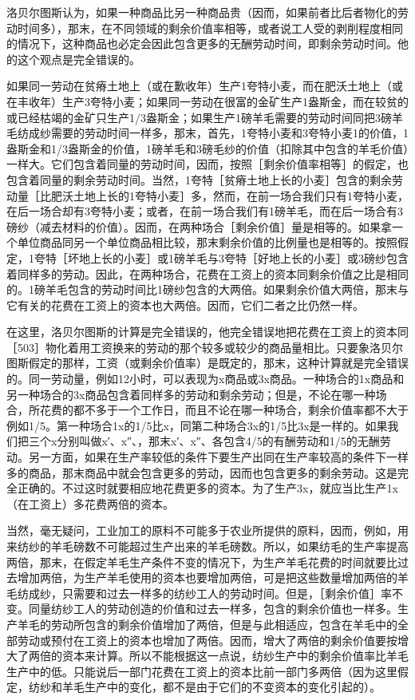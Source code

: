 洛贝尔图斯认为，如果一种商品比另一种商品贵（因而，如果前者比后者物化的劳动时间多），那末，在不同领域的剩余价值率相等，或者说工人受的剥削程度相同的情况下，这种商品也必定会因此包含更多的无酬劳动时间，即剩余劳动时间。他的这个观点是完全错误的。

如果同一劳动在贫瘠土地上（或在歉收年）生产1夸特小麦，而在肥沃土地上（或在丰收年）生产3夸特小麦；如果同一劳动在很富的金矿生产1盎斯金，而在较贫的或已经枯竭的金矿只生产1/3盎斯金；如果生产1磅羊毛需要的劳动时间同把3磅羊毛纺成纱需要的劳动时间一样多，那末，首先，1夸特小麦和3夸特小麦1的价值，1盎斯金和1/3盎斯金的价值，1磅羊毛和3磅毛纱的价值（扣除其中包含的羊毛价值）一样大。它们包含着同量的劳动时间，因而，按照［剩余价值率相等］的假定，也包含着同量的剩余劳动时间。当然，1夸特［贫瘠土地上长的小麦］包含的剩余劳动量［比肥沃土地上长的1夸特小麦］多，然而，在前一场合我们只有1夸特小麦，在后一场合却有3夸特小麦；或者，在前一场合我们有1磅羊毛，而在后一场合有3磅纱（减去材料的价值）。因而，在两种场合［剩余价值］量是相等的。如果拿一个单位商品同另一个单位商品相比较，那末剩余价值的比例量也是相等的。按照假定，1夸特［坏地上长的小麦］或1磅羊毛与3夸特［好地上长的小麦］或3磅纱包含着同样多的劳动。因此，在两种场合，花费在工资上的资本同剩余价值之比是相同的。1磅羊毛包含的劳动时间比1磅纱包含的大两倍。如果剩余价值大两倍，那末与它有关的花费在工资上的资本也大两倍。因而，它们二者之比仍然一样。

在这里，洛贝尔图斯的计算是完全错误的，他完全错误地把花费在工资上的资本同［503］物化着用工资换来的劳动的那个较多或较少的商品量相比。只要象洛贝尔图斯假定的那样，工资（或剩余价值率）是既定的，那末，这种计算就是完全错误的。同一劳动量，例如12小时，可以表现为x商品或3x商品。一种场合的1x商品和另一种场合的3x商品包含着同样多的劳动和剩余劳动；但是，不论在哪一种场合，所花费的都不多于一个工作日，而且不论在哪一种场合，剩余价值率都不大于例如1/5。第一种场合1x的1/5比x，同第二种场合3x的1/5比3x是一样的。如果我们把三个x分别叫做x′、x″、，那末x′、x″、各包含4/5的有酬劳动和1/5的无酬劳动。另一方面，如果在生产率较低的条件下要生产出同在生产率较高的条件下一样多的商品，那末商品中就会包含更多的劳动，因而也包含更多的剩余劳动。这是完全正确的。不过这时就要相应地花费更多的资本。为了生产3x，就应当比生产1x（在工资上）多花费两倍的资本。

当然，毫无疑问，工业加工的原料不可能多于农业所提供的原料，因而，例如，用来纺纱的羊毛磅数不可能超过生产出来的羊毛磅数。所以，如果纺毛的生产率提高两倍，那末，在假定羊毛生产条件不变的情况下，为生产羊毛花费的时间就要比过去增加两倍，为生产羊毛使用的资本也要增加两倍，可是把这些数量增加两倍的羊毛纺成纱，只需要和过去一样多的纺纱工人的劳动时间。但是，［剩余价值］率不变。同量纺纱工人的劳动创造的价值和过去一样多，包含的剩余价值也一样多。生产羊毛的劳动所包含的剩余价值增加了两倍，但是与此相适应，包含在羊毛中的全部劳动或预付在工资上的资本也增加了两倍。因而，增大了两倍的剩余价值要按增大了两倍的资本来计算。所以不能根据这一点说，纺纱生产中的剩余价值率比羊毛生产中的低。只能说后一部门花费在工资上的资本比前一部门多两倍（因为这里假定，纺纱和羊毛生产中的变化，都不是由于它们的不变资本的变化引起的）。

